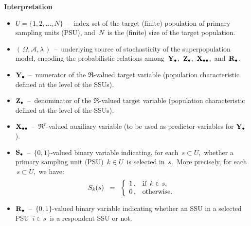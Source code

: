 \vskip 0.2cm
\noindent
\textbf{Interpretation}
\begin{itemize}
\item
    $U = \{1,2,\ldots,N\}$
    \,--\,
    index set of the target (finite) population of primary sampling units (PSU),
    and \,$N$\, is the (finite) size of the target population.
\item
    $\left(\,\Omega,\mathscr{A},\lambda\,\right)$
    \,--\,
    underlying source of stochasticity of the superpopulation model,
    encoding the probabilistic relations among
    \,$\mathbf{Y}_{\bullet}$,\, $\mathbf{Z}_{\bullet}$,\, $\mathbf{X}_{\bullet\bullet}$,\, and \,$\mathbf{R}_{\bullet}$.\,
\item
    $\mathbf{Y}_{\bullet}$
    \,--\,
    numerator of the $\Re$-valued target variable
    (population characteristic defined at the level of the SSUs).
\item
    $\mathbf{Z}_{\bullet}$
    \,--\,
    denominator of the $\Re$-valued target variable
    (population characteristic defined at the level of the SSUs).
\item
    $\mathbf{X}_{\bullet\bullet}$
    \,--\,
    $\Re^{r}$-valued auxiliary variable (to be used as predictor variables for $\mathbf{Y}_{\bullet}$).
\item
    $\mathbf{S}_{\bullet}$
    \,--\,
    $\{0,1\}$-valued binary variable indicating, for each \,$s \subset U$,\,
    whether a primary sampling unit (PSU) \,$k \in U$\, is selected in \,$s$.\,
    More precisely, for each \,$s \subset U$,\, we have:
    \begin{equation*}
    S_{k}(s)
    \;\; = \;\;
        \left\{\begin{array}{cl}
            1\,, & \textnormal{if \,$k \in s$},
            \\
            0\,, & \textnormal{otherwise}.
            \end{array}\right.
    \end{equation*}
\item
    $\mathbf{R}_{\bullet}$
    \,--\,
    $\{0,1\}$-valued binary variable indicating
    whether an SSU in a selected PSU \,$i \in s$\,
    is a respondent SSU or not.
\end{itemize}

